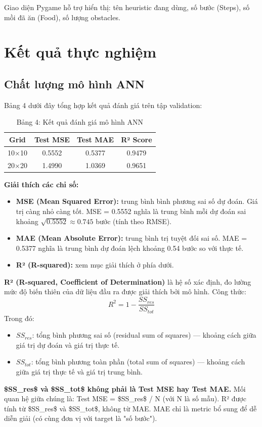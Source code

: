 \documentclass[12pt,a4paper]{article}
\begin{document}
Giao diện Pygame hỗ trợ hiển thị: tên heuristic đang dùng, số bước (Steps), số mồi đã ăn (Food), số lượng obstacles.

\newpage

\section{Kết quả thực nghiệm}

\subsection{Chất lượng mô hình ANN}

Bảng 4 dưới đây tổng hợp kết quả đánh giá trên tập validation:

\begin{table}[ht]
\centering
\begin{tabular}{|c|c|c|c|}
\hline
\textbf{Grid} & \textbf{Test MSE} & \textbf{Test MAE} & \textbf{R² Score} \\
\hline
10×10 & 0.5552 & 0.5377 & 0.9479 \\
20×20 & 1.4990 & 1.0369 & 0.9651 \\
\hline
\end{tabular}
\caption{Bảng 4: Kết quả đánh giá mô hình ANN}
\label{tab:eval}
\end{table}

\textbf{Giải thích các chỉ số:}
\begin{itemize}
    \item \textbf{MSE (Mean Squared Error):} trung bình bình phương sai số dự đoán. Giá trị càng nhỏ càng tốt. MSE = 0.5552 nghĩa là trung bình mỗi dự đoán sai khoảng $\sqrt{0.5552} \approx 0.745$ bước (tính theo RMSE).
    \item \textbf{MAE (Mean Absolute Error):} trung bình trị tuyệt đối sai số. MAE = 0.5377 nghĩa là trung bình dự đoán lệch khoảng 0.54 bước so với thực tế.
    \item \textbf{R² (R-squared):} xem mục giải thích ở phía dưới.
\end{itemize}

\textbf{R² (R-squared, Coefficient of Determination)} là hệ số xác định, đo lường mức độ biến thiên của dữ liệu đầu ra được giải thích bởi mô hình. Công thức:
\[
R^2 = 1 - \frac{SS_{res}}{SS_{tot}}
\]
Trong đó:
\begin{itemize}
    \item $SS_{res}$: tổng bình phương sai số (residual sum of squares) --- khoảng cách giữa giá trị dự đoán và giá trị thực tế.
    \item $SS_{tot}$: tổng bình phương toàn phần (total sum of squares) --- khoảng cách giữa giá trị thực tế và giá trị trung bình.
\end{itemize}
\textbf{\$SS\_{res}\$ và \$SS\_{tot}\$ không phải là Test MSE hay Test MAE.} Mối quan hệ giữa chúng là: Test MSE = \$SS\_{res}\$ / N (với N là số mẫu). R² được tính từ \$SS\_{res}\$ và \$SS\_{tot}\$, không từ MAE. MAE chỉ là metric bổ sung để dễ diễn giải (có cùng đơn vị với target là "số bước").
\end{document}
